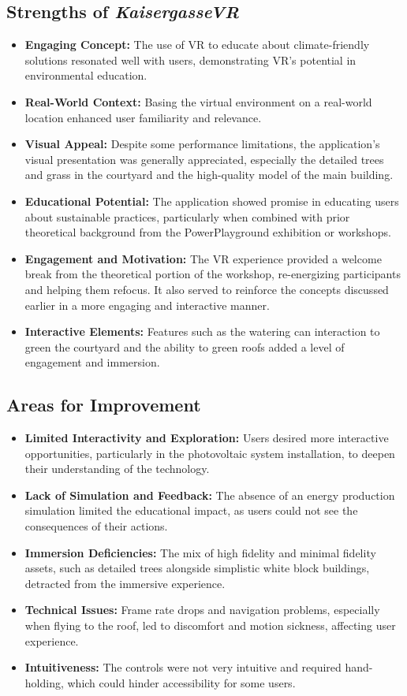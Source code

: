 \documentclass[draft, final]{vutinfth} %
\begin{document}
\subsection{Strengths of \textit{KaisergasseVR}}
\begin{itemize}
    \item \textbf{Engaging Concept:} The use of VR to educate about climate-friendly solutions resonated well with users, demonstrating VR's potential in environmental education.
    \item \textbf{Real-World Context:} Basing the virtual environment on a real-world location enhanced user familiarity and relevance.
    \item \textbf{Visual Appeal:} Despite some performance limitations, the application's visual presentation was generally appreciated, especially the detailed trees and grass in the courtyard and the high-quality model of the main building.
    \item \textbf{Educational Potential:} The application showed promise in educating users about sustainable practices, particularly when combined with prior theoretical background from the PowerPlayground exhibition or workshops.
    \item \textbf{Engagement and Motivation:} The VR experience provided a welcome break from the theoretical portion of the workshop, re-energizing participants and helping them refocus. It also served to reinforce the concepts discussed earlier in a more engaging and interactive manner.
    \item \textbf{Interactive Elements:} Features such as the watering can interaction to green the courtyard and the ability to green roofs added a level of engagement and immersion.
\end{itemize}

\subsection{Areas for Improvement}
\begin{itemize}
    \item \textbf{Limited Interactivity and Exploration:} Users desired more interactive opportunities, particularly in the photovoltaic system installation, to deepen their understanding of the technology.
    \item \textbf{Lack of Simulation and Feedback:} The absence of an energy production simulation limited the educational impact, as users could not see the consequences of their actions.
    \item \textbf{Immersion Deficiencies:} The mix of high fidelity and minimal fidelity assets, such as detailed trees alongside simplistic white block buildings, detracted from the immersive experience.
    \item \textbf{Technical Issues:} Frame rate drops and navigation problems, especially when flying to the roof, led to discomfort and motion sickness, affecting user experience.
    \item \textbf{Intuitiveness:} The controls were not very intuitive and required hand-holding, which could hinder accessibility for some users.
\end{itemize}
\end{document}

